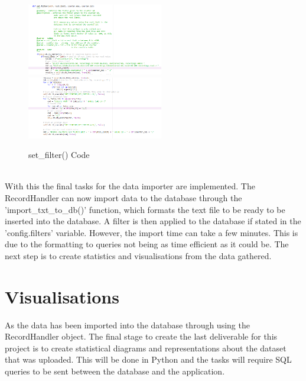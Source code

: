 \documentclass{report}
\begin{document}
\begin{figure}[h!]
    \centering
    \includegraphics[width=225]{set_filters.PNG}
    \includegraphics[width=225]{set_filters_2.PNG}
    \caption{set\_filter() Code}
    \label{fig:set_filter}
\end{figure} \\
With this the final tasks for the data importer are implemented. The  RecordHandler can now import data to the database through the 'import\_txt\_to\_db()' function, which formats the text file to be ready to be inserted into the database. A filter is then applied to the database if stated in the 'config.filters' variable. However, the import time can take a few minutes. This is due to the formatting to queries not being as time efficient as it could be. The next step is to create statistics and visualisations from the data gathered. \\ \newline
\clearpage
\section{Visualisations}
As the data has been imported into the database through using the RecordHandler object. The final stage to create the last deliverable for this project is to create statistical diagrams and representations about the dataset that was uploaded. This will be done in Python and the tasks will require SQL queries to be sent between the database and the application. 
\end{document}
